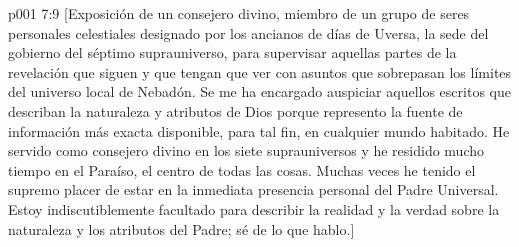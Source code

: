 \vsetoff
\vs p001 7:9 [Exposición de un consejero divino, miembro de un grupo de seres personales celestiales designado por los ancianos de días de Uversa, la sede del gobierno del séptimo suprauniverso, para supervisar aquellas partes de la revelación que siguen y que tengan que ver con asuntos que sobrepasan los límites del universo local de Nebadón. Se me ha encargado auspiciar aquellos escritos que describan la naturaleza y atributos de Dios porque represento la fuente de información más exacta disponible, para tal fin, en cualquier mundo habitado. He servido como consejero divino en los siete suprauniversos y he residido mucho tiempo en el Paraíso, el centro de todas las cosas. Muchas veces he tenido el supremo placer de estar en la inmediata presencia personal del Padre Universal. Estoy indiscutiblemente facultado para describir la realidad y la verdad sobre la naturaleza y los atributos del Padre; sé de lo que hablo.]
